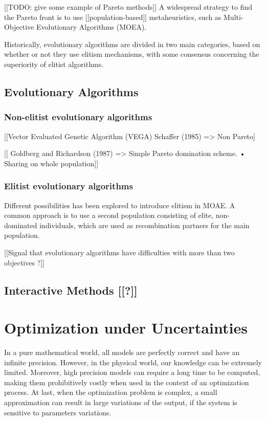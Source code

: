 [[TODO: give some example of Pareto methods]]
A widespread strategy to find the Pareto front is to use [[population-based]] metaheuristics, such as Multi-Objective Evolutionary Algorithms (MOEA). 

Historically, evolutionary algorithms are divided in two main categories, based on whether or not they use elitism mechanisms, with some consensus concerning the superiority of elitist algorithms.

\section{Evolutionary Algorithms}
\subsection{Non-elitist evolutionary algorithms}

[[Vector Evaluated Genetic Algorithm (VEGA) Schaffer (1985) => Non Pareto]

[[  Goldberg and Richardson (1987) =>  Simple Pareto domination scheme. • Sharing on whole population]]


\subsection{Elitist evolutionary algorithms}

Different possibilities has been explored to introduce elitism in MOAE. A common approach is to use a second population consisting of elite, non-dominated individuals, which are used as recombination partners for the main population.

[[Signal that evolutionary algorithms have difficulties with more than two objectives ?]]

\section{Interactive Methods [[?]]}

\chapter{Optimization under Uncertainties}

In a pure mathematical world, all models are perfectly correct and have an infinite precision. However, in the physical world, our knowledge can be extremely limited. Moreover, high precision models can require a long time to be computed, making them prohibitively costly when used in the context of an optimization process. At last, when the optimization problem is complex, a small approximation can result in large variations of the output, if the system is sensitive to parameters variations.

